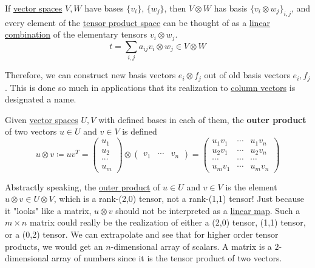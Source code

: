 	\begin{theorem}
	  \label{thm:basis-of-tensor-product-space}
		If \hyperref[def:vector-space]{vector spaces} $V, W$ have bases $\{v_i\}$, $\{w_j\}$, then $V \otimes W$ has basis $\{v_i \otimes w_j\}_{i, j}$, and every element of the \hyperref[def:tensor]{tensor product space} can be thought of as a \hyperref[def:linear-combination]{linear combination} of the elementary tensors $v_i \otimes w_j$. 
		\begin{equation}
			t = \sum_{i, j} a_{ij} v_i \otimes w_j \in V \otimes W
		\end{equation}
	\end{theorem}

	Therefore, we can construct new basis vectors $e_i \otimes f_j$ out of old basis vectors $e_i, f_j$. This is done so much in applications that its realization to \hyperref[def:column-vector]{column vectors} is designated a name. 

	\begin{definition}
	  \label{def:outer-product}
    Given \hyperref[def:vector-space]{vector spaces} $U, V$ with defined bases in each of them, the \textbf{outer product} of two vectors $u \in U$ and $v \in V$ is defined
		\begin{equation}
			u \otimes v \coloneqq u v^T = \begin{pmatrix}
			u_1 \\ u_2 \\ \cdots \\ u_m
			\end{pmatrix} \otimes \begin{pmatrix}
				v_1 & \cdots & v_n
			\end{pmatrix} = \begin{pmatrix}
				u_1 v_1 & \cdots & u_1 v_n \\
				u_2 v_1 & \cdots & u_2 v_n \\
				\cdots & \cdots & \cdots \\
				u_m v_1 & \cdots & u_m v_n 
			\end{pmatrix}
		\end{equation}
  \end{definition}

  Abstractly speaking, the \hyperref[def:outer-product]{outer product} of $u \in U$ and $v \in V$ is the element $u \otimes v \in U \otimes V$, which is a rank-(2,0) tensor, not a rank-(1,1) tensor! Just because it "looks" like a matrix, $u \otimes v$ should not be interpreted as a \hyperref[def:linear_map]{linear map}. Such a $m \times n$ matrix could really be the realization of either a (2,0) tensor, (1,1) tensor, or a (0,2) tensor. We can extrapolate and see that for higher order tensor products, we would get an $n$-dimensional array of scalars. A matrix is a $2$-dimensional array of numbers since it is the tensor product of two vectors. 

